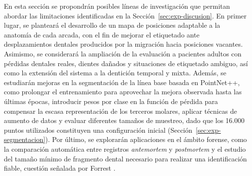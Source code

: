En esta sección se propondrán posibles líneas de investigación que permitan abordar las limitaciones identificadas en la Sección~\ref{sec:exp-discusion}. En primer lugar, se planteará el desarrollo de un mapa de posiciones adaptable a la anatomía de cada arcada, con el fin de mejorar el etiquetado ante desplazamientos dentales producidos por la migración hacia posiciones vacantes. Asimismo, se considerará la ampliación de la evaluación a pacientes adultos con pérdidas dentales reales, dientes dañados y situaciones de etiquetado ambiguo, así como la extensión del sistema a la dentición temporal y mixta. Además, se estudiarán mejoras en la segmentación de la línea base basada en PointNet++, como prolongar el entrenamiento para aprovechar la mejora observada hasta las últimas épocas, introducir pesos por clase en la función de pérdida para compensar la escasa representación de los terceros molares, aplicar técnicas de aumento de datos y evaluar diferentes tamaños de muestreo, dado que los 16.000 puntos utilizados constituyen una configuración inicial (Sección~\ref{sec:exp-segmentacion}). Por último, se explorarán aplicaciones en el ámbito forense, como la comparación automática entre registros \textit{antemortem} y \textit{postmortem} y el estudio del tamaño mínimo de fragmento dental necesario para realizar una identificación fiable, cuestión señalada por Forrest \cite{forrestForensicOdontologyDVI2019}.
